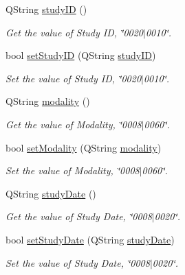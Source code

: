 \begin{DoxyCompactItemize}
Q\+String \hyperlink{class_dicom_dictionary_interface_a39bf8ab26ca9b98b5eb5e844b33453f2}{study\+ID} ()
\begin{DoxyCompactList}\small\item\em Get the value of Study ID, \char`\"{}0020$\vert$0010\char`\"{}. \end{DoxyCompactList}\item 
bool \hyperlink{class_dicom_dictionary_interface_a12f56660f15526764fd5d1d9e010c453}{set\+Study\+ID} (Q\+String \hyperlink{class_dicom_dictionary_interface_a39bf8ab26ca9b98b5eb5e844b33453f2}{study\+ID})
\begin{DoxyCompactList}\small\item\em Set the value of Study ID, \char`\"{}0020$\vert$0010\char`\"{}. \end{DoxyCompactList}\item 
Q\+String \hyperlink{class_dicom_dictionary_interface_aff41efeaedec8cf63e1ea211b4a7cbcd}{modality} ()
\begin{DoxyCompactList}\small\item\em Get the value of Modality, \char`\"{}0008$\vert$0060\char`\"{}. \end{DoxyCompactList}\item 
bool \hyperlink{class_dicom_dictionary_interface_a6c30ad45495e7739ceaabf866f6147e1}{set\+Modality} (Q\+String \hyperlink{class_dicom_dictionary_interface_aff41efeaedec8cf63e1ea211b4a7cbcd}{modality})
\begin{DoxyCompactList}\small\item\em Set the value of Modality, \char`\"{}0008$\vert$0060\char`\"{}. \end{DoxyCompactList}\item 
Q\+String \hyperlink{class_dicom_dictionary_interface_ab52794617227e2b3722dbfea66a00306}{study\+Date} ()
\begin{DoxyCompactList}\small\item\em Get the value of Study Date, \char`\"{}0008$\vert$0020\char`\"{}. \end{DoxyCompactList}\item 
bool \hyperlink{class_dicom_dictionary_interface_ac1e6c749f2e192704cf0c9fe09e898ca}{set\+Study\+Date} (Q\+String \hyperlink{class_dicom_dictionary_interface_ab52794617227e2b3722dbfea66a00306}{study\+Date})
\begin{DoxyCompactList}\small\item\em Set the value of Study Date, \char`\"{}0008$\vert$0020\char`\"{}. \end{DoxyCompactList}\item 

\end{DoxyCompactItemize}

